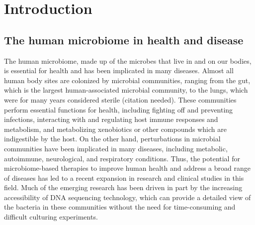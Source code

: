 
\chapter{Introduction}

\section{The human microbiome in health and disease}

The human microbiome, made up of the microbes that live in and on our bodies, is essential for health and has been implicated in many diseases.
Almost all human body sites are colonized by microbial communities, ranging from the gut, which is the largest human-associated microbial community, to the lungs, which were for many years considered sterile (citation needed).
These communities perform essential functions for health, including fighting off and preventing infections, interacting with and regulating host immune responses and metabolism, and metabolizing xenobiotics or other compounds which are indigestible by the host.
On the other hand, perturbations in microbial communities have been implicated in many diseases, including metabolic, autoimmune, neurological, and respiratory conditions.
Thus, the potential for microbiome-based therapies to improve human health and address a broad range of diseases has led to a recent expansion in research and clinical studies in this field.
Much of the emerging research has been driven in part by the increasing accessibility of DNA sequencing technology, which can provide a detailed view of the bacteria in these communities without the need for time-consuming and difficult culturing experiments.

